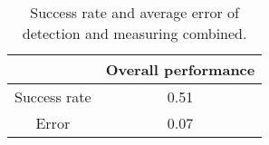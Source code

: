 \begin{table}%
\centering
\begin{tabular}{@{} *2c @{}}
\toprule
 & {Overall performance}\\ 
\midrule
Success rate	& 0.51 \\ 
Error 			& 0.07 \\
\bottomrule 
 \end{tabular}
 \caption{Success rate and average error of detection and measuring combined.}
\label{table:overall_overall}
\end{table}